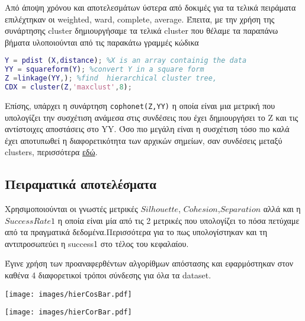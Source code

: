 Από άποψη χρόνου και αποτελεσμάτων ύστερα από δοκιμές για τα τελικά πειράματα επιλέχτηκαν οι weighted, ward, complete, average.
Έπειτα, με την χρήση της συνάρτησης cluster δημιουργήσαμε τα τελικά cluster που θέλαμε τα παραπάνω βήματα υλοποιούνται από τις παρακάτω γραμμές κώδικα 

\begin{lstlisting}[language=Matlab]
%simple example of hierarchical clustering
Y = pdist (X,distance); %X is an array containig the data
YY = squareform(Y); %convert Y in a square form
Z =linkage(YY,); %find  hierarchical cluster tree,
CDX = cluster(Z,'maxclust',8);
\end{lstlisting}

Επίσης, υπάρχει η συνάρτηση \lstinline!cophonet(Z,YY)! η οποία είναι μια μετρική που υπολογίζει την συσχέτιση ανάμεσα στις συνδέσεις που έχει δημιουργήσει το Z και τις αντίστοιχες αποστάσεις στο YY.
Όσο πιο μεγάλη είναι η συσχέτιση τόσο πιο καλά έχει αποτυπωθεί η διαφορετικότητα των αρχικών σημείων, σαν συνδέσεις μεταξύ clusters, περισσότερα
\href{https://en.wikipedia.org/wiki/Cophenetic_correlation}{εδώ}.

\subsection{Πειραματικά αποτελέσματα}
Χρησιμοποιούνται οι γνωστές μετρικές $Silhouette$, $Cohesion$,$Separation$
αλλά και η $Success Rate 1$ η οποία είναι μία από τις 2 μετρικές που  υπολογίζει το πόσα πετύχαμε από τα πραγματικά δεδομένα.Περισσότερα για το πως υπολογίστηκαν και τη αντιπροσωπεύει η success1 στο τέλος του κεφαλαίου.    

Έγινε χρήση των προαναφερθέντων αλγορίθμων απόστασης και εφαρμόστηκαν στον καθένα 4 διαφορετικοί τρόποι σύνδεσης για όλα τα dataset.

\noindent\begin{minipage}{\linewidth}
    \centering
    \texttt{[image: images/hierCosBar.pdf]}
    \label{fig:CosineHier}
\end{minipage}

\noindent\begin{minipage}{\linewidth}
    \centering
    \texttt{[image: images/hierCorBar.pdf]}
    \label{fig:hierCorBar}
\end{minipage}

